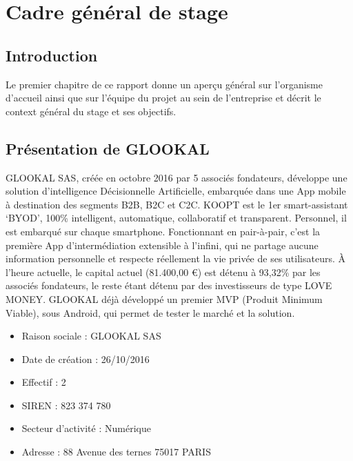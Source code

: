 \chapter{Cadre général de stage}
\label{chap:Cadre general de stage}

\section*{Introduction}

Le premier chapitre de ce rapport donne un aperçu général sur l’organisme d’accueil ainsi que sur l’équipe du projet au sein de l’entreprise et décrit le context général du stage et ses objectifs.


\section{Présentation de GLOOKAL}

GLOOKAL SAS, créée en octobre 2016 par 5 associés fondateurs, développe une solution d'intelligence Décisionnelle Artificielle, embarquée dans une App mobile à destination des segments B2B, B2C et C2C. KOOPT est le 1er smart-assistant ‘BYOD’, 100\% intelligent, automatique, collaboratif et transparent. Personnel, il est embarqué sur chaque smartphone. Fonctionnant en pair-à-pair, c’est la première App d’intermédiation extensible à l’infini, qui ne partage aucune information personnelle et respecte réellement la vie privée de ses utilisateurs. 
À l’heure actuelle, le capital actuel (81.400,00 €) est détenu à 93,32\% par les associés fondateurs, le reste étant détenu par des investisseurs de type LOVE MONEY. GLOOKAL déjà développé un premier MVP (Produit Minimum Viable), sous Android, qui permet de tester le marché et la solution.
 \begin{itemize}
     \item Raison sociale : GLOOKAL SAS 
     \item Date de création : 26/10/2016
     \item Effectif : 2
     \item SIREN : 823 374 780
     \item Secteur d’activité : Numérique
     \item Adresse : 88 Avenue des ternes 75017 PARIS 
 \end{itemize}


